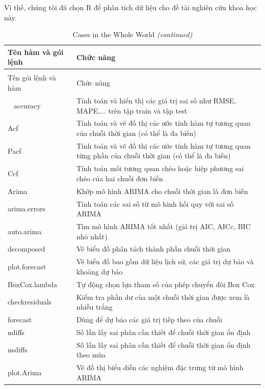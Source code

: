 \documentclass[12pt, a4paper,oneside]{book}
\theoremstyle{definition}
\begin{document}
Vì thế, chúng tôi đã chọn R để phân tích dữ liệu cho đề tài nghiên cứu khoa học này.
\begingroup\fontsize{10}{5}\selectfont
\begin{longtable}{p{3.2cm}p{11cm}}
	\caption{Các hàm và gói lệnh được sử dụng trong bài báo cáo} \label{Duong}\\
	\toprule
	Tên hàm và gói lệnh & Chức năng\\
	\midrule
	\endfirsthead
	\caption[]{Cases in the Whole World \textit{(continued)}}\\
	\toprule
	Tên gói lệnh và hàm & Chức năng\\
	\midrule
	\endhead
	\
	\endfoot
	\bottomrule
	\endlastfoot
	\rowcolor{gray!6} accuracy & Tính toán và hiển thị các giá trị sai số như RMSE, MAPE,... trên tập train và tập test\\
	Acf & Tính toán và vẽ đồ thị các ước tính hàm tự tương quan của chuỗi thời gian (có thể là đa biến)\\
	\rowcolor{gray!6} Pacf &Tính toán và vẽ đồ thị các ước tính hàm tự tương quan từng phần của chuỗi thời gian (có thể là đa biến) \\
	Ccf &Tính toán mối tương quan chéo hoặc hiệp phương sai chéo của hai chuỗi đơn biến \\
	\rowcolor{gray!6} Arima& Khớp mô hình ARIMA cho chuỗi thời gian là đơn biến\\ 
    arima.errors & Tính toán các sai số từ mô hình hồi quy với sai số ARIMA \\
	\rowcolor{gray!6} auto.arima & Tìm mô hình ARIMA tốt nhất (giá trị AIC, AICc, BIC nhỏ nhất) \\
	decomposed& Vẽ biểu đồ phân tách thành phần chuỗi thời gian\\
	\rowcolor{gray!6} plot.forecast & Vẽ biểu đồ bao gồm dữ liệu lịch sử, các giá trị dự báo và khoảng dự báo \\
	BoxCox.lambda & Tự động chọn lựa tham số của phép chuyển đôi Box Cox\\
	\rowcolor{gray!6} checkresiduals&Kiểm tra phần dư của một chuỗi thời gian được xem là nhiễu trắng \\
	forecast& Dùng để dự báo các giá trị tiếp theo của chuỗi\\
	\rowcolor{gray!6} ndiffs& Số lần lấy sai phân cần thiết để chuỗi thời gian ổn định\\
	nsdiffs&Số lần lấy sai phân cần thiết để chuỗi thời gian ổn định theo mùa \\
	\rowcolor{gray!6} plot.Arima &Vẽ đồ thị biểu diễn các nghiệm đặc trưng từ mô hình ARIMA \\

\end{longtable}
\end{document}
